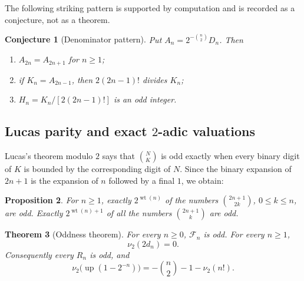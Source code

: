 \documentclass[11pt]{article}
\numberwithin{equation}{section}
\newtheorem{theorem}{Theorem}[section]
\newtheorem{proposition}[theorem]{Proposition}
\newtheorem{conjecture}[theorem]{Conjecture}
\theoremstyle{definition}
\theoremstyle{remark}
\DeclareMathOperator{\wt}{wt}
\newcommand{\upf}{\operatorname{up}}
\begin{document}
The following striking pattern is supported by computation and is recorded
as a conjecture, not as a theorem.

\begin{conjecture}[Denominator pattern]\label{conj:denominator}
Put $A_n=2^{-\binom n2}D_n$.  Then
\begin{enumerate}[label=\textup{(\alph*)}]
\item $A_{2n}=A_{2n+1}$ for $n\ge1$;
\item if $K_n=A_{2n-1}$, then $2(2n-1)!$ divides $K_n$;
\item $H_n=K_n/[2(2n-1)!]$ is an odd integer.
\end{enumerate}
\end{conjecture}

\subsection{Lucas parity and exact \texorpdfstring{$2$-adic}{2-adic} valuations}

Lucas's theorem modulo $2$ says that $\binom{N}{K}$ is odd exactly when every
binary digit of $K$ is bounded by the corresponding digit of $N$.  Since the
binary expansion of $2n+1$ is the expansion of $n$ followed by a final $1$,
we obtain:

\begin{proposition}\label{prop:odd-binomial-count}
For $n\ge1$, exactly $2^{\wt(n)}$ of the numbers
$\binom{2n+1}{2k}$, $0\le k\le n$, are odd.  Exactly
$2^{\wt(n)+1}$ of all the numbers $\binom{2n+1}{k}$ are odd.
\end{proposition}

\begin{theorem}[Oddness theorem]\label{thm:oddness}
For every $n\ge0$, $\mathcal F_n$ is odd.  For every $n\ge1$,
\begin{equation}\label{eq:2dn-valuation}
 \nu_2(2d_n)=0.
\end{equation}
Consequently every $R_n$ is odd, and
\begin{equation}\label{eq:up-valuation}
 \nu_2\bigl(\upf(1-2^{-n})\bigr)
 =-\binom n2-1-\nu_2(n!).
\end{equation}
\end{theorem}
\end{document}

